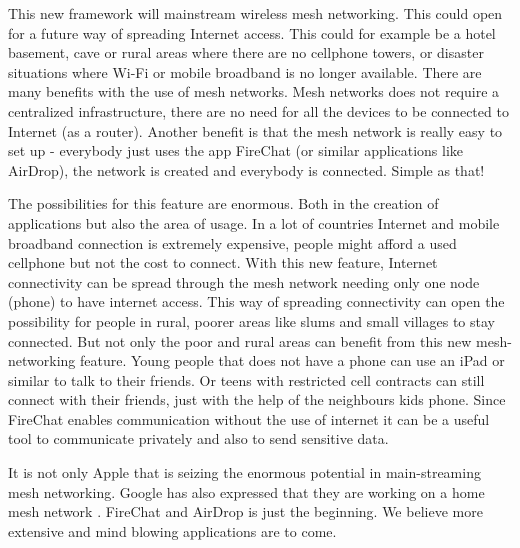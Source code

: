 This new framework will mainstream wireless mesh networking. This could open for a future way of spreading Internet access. This could for example be a hotel basement, cave or rural areas where there are no cellphone towers, or disaster situations where Wi-Fi or mobile broadband  is no longer available. There are many benefits with the use of mesh networks. Mesh networks does not require a centralized infrastructure, there are no need for all the devices to be connected to Internet (as a router). Another benefit is that the mesh network is really easy to set up - everybody just uses the app FireChat (or similar applications like AirDrop), the network is created and everybody is connected. Simple as that! 

The possibilities for this feature are enormous. Both in the creation of applications but also the area of usage. In a lot of countries Internet and mobile broadband connection is extremely expensive, people might afford a used cellphone but not the cost to connect. With this new feature, Internet connectivity can be spread through the mesh network needing only one node (phone) to have internet access. This way of spreading connectivity can open the possibility for people in rural, poorer areas like slums and small villages to stay connected. But not only the poor and rural areas can benefit from this new mesh-networking feature. Young people that does not have a phone can use an iPad or similar to talk to their friends. Or teens with restricted cell contracts can still connect with their friends, just with the help of the neighbours kids phone. Since FireChat enables communication without the use of internet it can be a useful tool to communicate privately and also to send sensitive data.
 
It is not only Apple that is seizing the enormous potential in main-streaming mesh networking. Google has also expressed that they are working on a home mesh network \cite{googleMesh}. FireChat and AirDrop is just the beginning. We believe more extensive and mind blowing applications are to come. 


